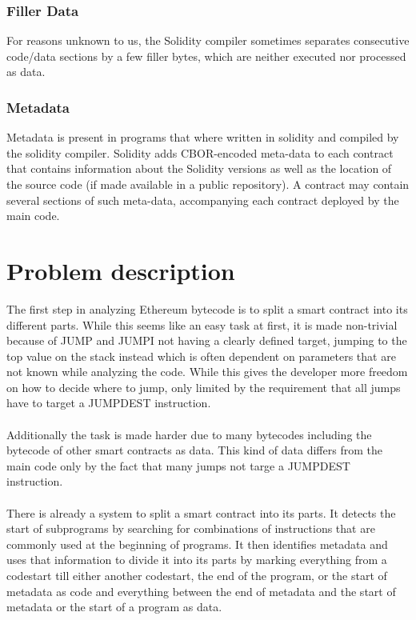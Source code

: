 \documentclass{article}
\begin{document}
\subsubsection{Filler Data}
    For reasons unknown to us, the Solidity compiler sometimes separates consecutive code/data sections by a few filler bytes, which are neither executed nor processed as data.
\subsubsection{Metadata\cite{solidity:metadata}}
    Metadata is present in programs that where written in solidity and compiled by the solidity compiler. Solidity adds CBOR-encoded meta-data to each contract that contains information about the Solidity versions as well as the location of the source code (if made available in a public repository). A contract may contain several sections of such meta-data, accompanying each contract deployed by the main code. 

\section{Problem description}

    The first step in analyzing Ethereum bytecode is to split a smart contract into its different parts. While this seems like an easy task at first, it is made non-trivial because of JUMP and JUMPI not having a clearly defined target, jumping to the top value on the stack instead which is often dependent on parameters that are not known while analyzing the code. While this gives the developer more freedom on how to decide where to jump, only limited by the requirement that all jumps have to target a JUMPDEST instruction.

\paragraph{}
    Additionally the task is made harder due to many bytecodes including the bytecode of other smart contracts as data. This kind of data differs from the main code only by the fact that many jumps not targe a JUMPDEST instruction.

\paragraph{}
    There is already a system to split a smart contract into its parts. It detects the start of subprograms by searching for combinations of instructions that are commonly used at the beginning of programs. It then identifies metadata and uses that information to divide it into its parts by marking everything from a codestart till either another codestart, the end of the program, or the start of metadata as code and everything between the end of metadata and the start of metadata or the start of a program as data. 
\end{document}
